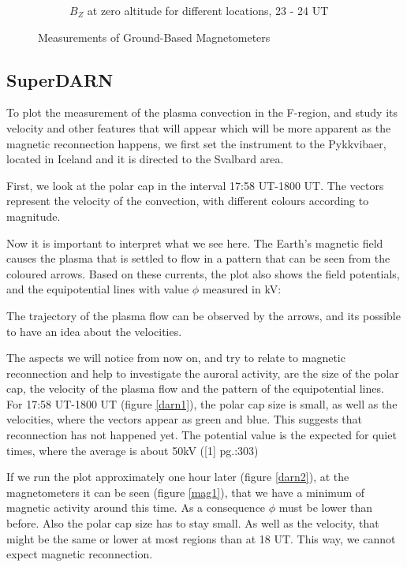 \documentclass[10pt,a4paper]{article}
\begin{document}
\begin{figure}[h]
\begin{subfigure}[h]{.5\textwidth}
		\caption{$B_Z$ at zero altitude for different locations, 23 - 24 UT}
		\label{mag7}
	\end{subfigure}
	\caption{Measurements of Ground-Based Magnetometers}
	\label{magg}
\end{figure}

\subsection{SuperDARN}

To plot the measurement of the plasma convection in the F-region, and study its velocity and other features that will appear which will be more apparent as the magnetic reconnection happens, we first set the instrument to the Pykkvibaer, located in Iceland and it is directed to the Svalbard area.

First, we look at the polar cap in the interval 17:58 UT-1800 UT. The vectors represent the velocity of the convection, with different colours according to magnitude.

Now it is important to interpret what we see here. The Earth's magnetic field causes the plasma that is settled to flow in a pattern that can be seen from the coloured arrows. Based on these currents, the plot also shows the field potentials, and the equipotential lines with value $\phi$ measured in kV:

The trajectory of the plasma flow can be observed by the arrows, and its possible to have an idea about the velocities.

The aspects we will notice from now on, and try to relate to magnetic reconnection and help to investigate the auroral activity, are the size of the polar cap, the velocity of the plasma flow and the pattern of  the equipotential lines. For 17:58 UT-1800 UT (figure \ref{darn1}), the polar cap size is small, as well as the velocities, where the vectors appear as green and blue. This suggests that reconnection has not happened yet. The potential value is the expected for quiet times, where the average is about 50kV ([1] pg.:303)

If we run the plot approximately one hour later (figure \ref{darn2}), at the magnetometers it can be seen (figure \ref{mag1}), that we have a minimum of magnetic activity around this time. As a consequence $\phi$ must be lower than before. Also the polar cap size has to stay small. As well as the velocity, that might be the same or lower at most regions than at 18 UT. This way, we cannot expect magnetic reconnection.
\end{document}
